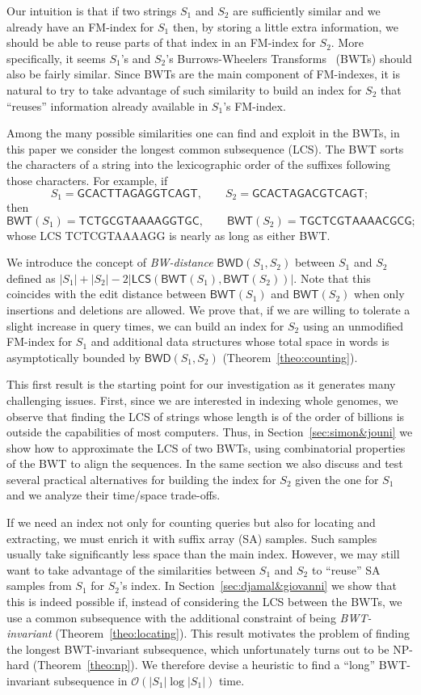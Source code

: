 \documentclass{llncs}
\newcommand{\Oh}[1]
  {\ensuremath{\mathcal{O}\!\left( {#1} \right)}}
\newcommand{\LCS}
  {\ensuremath{\mathsf{LCS}}}
\newcommand{\BWD}
  {\ensuremath{\mathsf{BWD}}}
\newcommand{\BWT}
  {\ensuremath{\mathsf{BWT}}}
\begin{document}
Our intuition is that if two strings $S_1$ and $S_2$ are sufficiently similar
and we already have an FM-index for $S_1$ then, by storing a little extra
information, we should be able to reuse parts of that index in an FM-index
for $S_2$. More specifically, it seems $S_1$'s and $S_2$'s Burrows-Wheelers
Transforms~\cite{BW94} (BWTs) should also be fairly similar. Since BWTs are
the main component of FM-indexes, it is natural to try to take advantage of
such similarity to build an index for $S_2$ that ``reuses'' information
already available in $S_1$'s FM-index.

Among the many possible similarities one can find and exploit in the BWTs, in
this paper we consider the longest common subsequence (LCS). The BWT sorts
the characters of a string into the lexicographic order of the suffixes
following those characters.  For example, if
$$
S_1 = \mathsf{GCACTTAGAGGTCAGT},\qquad
S_2 = \mathsf{GCACTAGACGTCAGT};
$$
then
$$
\BWT (S_1) = \mathsf{TCTGCGTAAAAGGTGC},\qquad
\BWT (S_2) = \mathsf{TGCTCGTAAAACGCG};
$$
whose LCS {\sf TCTCGTAAAAGG} is nearly as long as either BWT.

We introduce the concept of {\em BW-distance} \(\BWD (S_1, S_2)\) between
$S_1$ and $S_2$ defined as $|S_1| + |S_2| - 2 |\LCS(\BWT (S_1),\BWT (S_2))|$.
Note that this coincides with the edit distance between $\BWT (S_1)$ and
$\BWT (S_2)$ when only insertions and deletions are allowed. We prove that,
if we are willing to tolerate a slight increase in query times, we can build
an index for $S_2$ using an unmodified FM-index for $S_1$ and additional data
structures whose total space in words is asymptotically bounded by $\BWD
(S_1, S_2)$ (Theorem~\ref{theo:counting}).

This first result is the starting point for our investigation as it generates
many challenging issues. First, since we are interested in indexing whole
genomes, we observe that finding the LCS of strings
whose length is of the order of billions is outside the capabilities of most
computers. Thus, in Section~\ref{sec:simon&jouni} we show how to approximate
the LCS of two BWTs, using combinatorial properties of
the BWT to align the sequences. In the same section we also discuss and test
several practical alternatives for building the index for $S_2$ given the one
for $S_1$ and we analyze their time/space trade-offs.

If we need an index not only for counting queries but also for locating and
extracting, we must enrich it with suffix array (SA) samples. Such samples
usually take significantly less space than the main index. However, we may
still want to take advantage of the similarities between $S_1$ and $S_2$ to
``reuse'' SA samples from $S_1$ for $S_2$'s index. In
Section~\ref{sec:djamal&giovanni} we show that this is indeed possible if,
instead of considering the LCS between the BWTs, we use a common subsequence
with the additional constraint of being {\em BWT-invariant}
(Theorem~\ref{theo:locating}). This result motivates the problem of finding
the longest BWT-invariant subsequence, which unfortunately turns out to be
NP-hard (Theorem~\ref{theo:np}). We therefore devise a heuristic to find a
``long'' BWT-invariant subsequence in $\Oh{|S_1|\log|S_1|}$ time.
\end{document}
